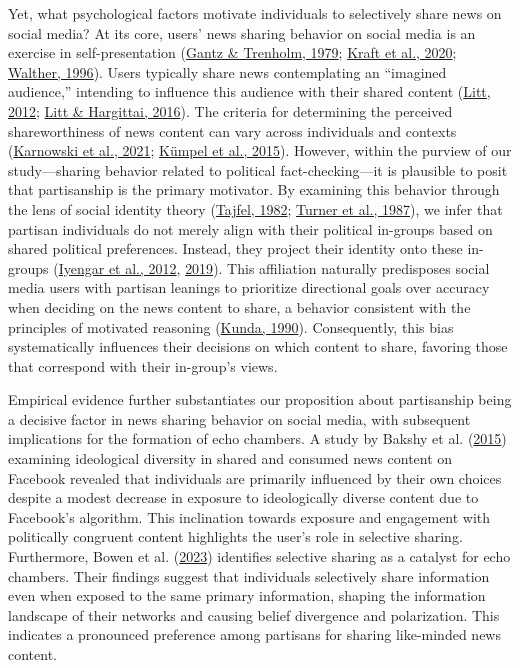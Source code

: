 \documentclass[
  12pt,
]{article}
\begin{document}
Yet, what psychological factors motivate individuals to selectively
share news on social media? At its core, users' news sharing behavior on
social media is an exercise in self-presentation
(\protect\hyperlink{ref-gantz1979people}{Gantz \& Trenholm, 1979};
\protect\hyperlink{ref-kraft2020social}{Kraft et al., 2020};
\protect\hyperlink{ref-walther1996computer}{Walther, 1996}). Users
typically share news contemplating an ``imagined audience,'' intending
to influence this audience with their shared content
(\protect\hyperlink{ref-litt2012knock}{Litt, 2012};
\protect\hyperlink{ref-litt2016imagined}{Litt \& Hargittai, 2016}). The
criteria for determining the perceived shareworthiness of news content
can vary across individuals and contexts
(\protect\hyperlink{ref-karnowski2021worth}{Karnowski et al., 2021};
\protect\hyperlink{ref-kumpel2015news}{Kümpel et al., 2015}). However,
within the purview of our study---sharing behavior related to political
fact-checking---it is plausible to posit that partisanship is the
primary motivator. By examining this behavior through the lens of social
identity theory (\protect\hyperlink{ref-tajfel1982social}{Tajfel, 1982};
\protect\hyperlink{ref-turner1987rediscovering}{Turner et al., 1987}),
we infer that partisan individuals do not merely align with their
political in-groups based on shared political preferences. Instead, they
project their identity onto these in-groups
(\protect\hyperlink{ref-iyengar2012affect}{Iyengar et al., 2012},
\protect\hyperlink{ref-iyengar2019origins}{2019}). This affiliation
naturally predisposes social media users with partisan leanings to
prioritize directional goals over accuracy when deciding on the news
content to share, a behavior consistent with the principles of motivated
reasoning (\protect\hyperlink{ref-kunda1990case}{Kunda, 1990}).
Consequently, this bias systematically influences their decisions on
which content to share, favoring those that correspond with their
in-group's views.

Empirical evidence further substantiates our proposition about
partisanship being a decisive factor in news sharing behavior on social
media, with subsequent implications for the formation of echo chambers.
A study by Bakshy et al.
(\protect\hyperlink{ref-bakshy2015exposure}{2015}) examining ideological
diversity in shared and consumed news content on Facebook revealed that
individuals are primarily influenced by their own choices despite a
modest decrease in exposure to ideologically diverse content due to
Facebook's algorithm. This inclination towards exposure and engagement
with politically congruent content highlights the user's role in
selective sharing. Furthermore, Bowen et al.
(\protect\hyperlink{ref-bowen2023learning}{2023}) identifies selective
sharing as a catalyst for echo chambers. Their findings suggest that
individuals selectively share information even when exposed to the same
primary information, shaping the information landscape of their networks
and causing belief divergence and polarization. This indicates a
pronounced preference among partisans for sharing like-minded news
content.
\end{document}
